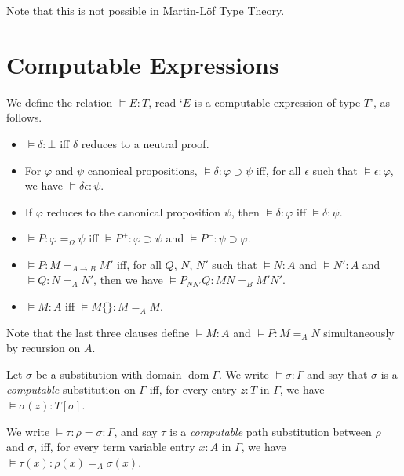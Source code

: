 \documentclass[a4paper,UKenglish]{lipics-v2016}
\newcommand*{\dom}{\ensuremath{\operatorname{dom}}}
\theoremstyle{plain}
\theoremstyle{definition}
\begin{document}
Note that this is not possible in Martin-L\"{o}f Type Theory.

\section{Computable Expressions}
\label{section:computable}

\begin{definition}
We define the relation $\models E : T$, read `$E$ is a computable expression of type $T$', as follows.
\begin{itemize}
\item
$\models \delta : \bot$ iff $\delta$ reduces to a neutral proof.
\item
For $\varphi$ and $\psi$ canonical propositions, $\models \delta : \varphi \supset \psi$ iff, for all $\epsilon$ such that $\models \epsilon : \varphi$, we have $\models \delta \epsilon : \psi$.
\item
If $\varphi$ reduces to the canonical proposition $\psi$, then $\models \delta : \varphi$ iff $\models \delta : \psi$.
\item
$\models P : \varphi =_\Omega \psi$ iff $\models P^+ : \varphi \supset \psi$ and $\models P^- : \psi \supset \varphi$.
\item
$\models P : M =_{A \rightarrow B} M'$ iff, for all $Q$, $N$, $N'$ such that $\models N : A$ and $\models N' : A$ and $\models Q : N =_A N'$, then we have $\models P_{NN'}Q : MN =_B M'N'$.
\item
$\models M : A$ iff $\models M \{\} : M =_A M$.
\end{itemize}
Note that the last three clauses define $\models M : A$ and $\models P : M =_A N$ simultaneously by recursion on $A$.
\end{definition}

\begin{definition}
Let $\sigma$ be a substitution with domain $\dom \Gamma$.  We write $\models \sigma : \Gamma$ and say that
$\sigma$ is a \emph{computable} substitution on $\Gamma$ iff, for every entry $z : T$ in $\Gamma$, we have $\models \sigma(z) : T [ \sigma ]$.

We write $\models \tau : \rho = \sigma : \Gamma $, and say $\tau$ is a \emph{computable} path substitution between $\rho$ and $\sigma$, iff, for every term variable entry $x : A$ in $\Gamma$, we have $\models \tau(x) : \rho(x) =_A \sigma(x)$.
\end{definition}
\end{document}
